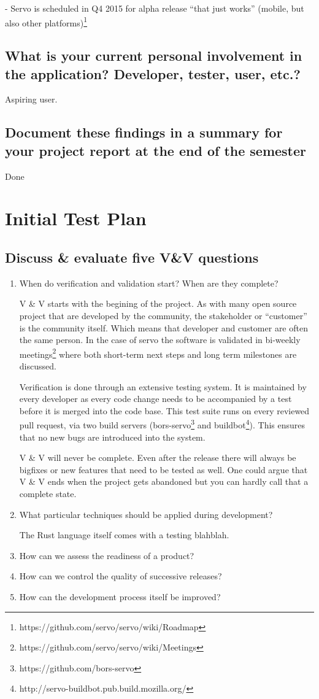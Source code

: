\documentclass{scrartcl}
\begin{document}
- Servo is scheduled in Q4 2015 for alpha release ``that just works'' (mobile, but also other platforms)\footnote{https://github.com/servo/servo/wiki/Roadmap}
\subsection*{What is your current personal involvement in the
application? Developer, tester, user, etc.?}
Aspiring user.
\subsection*{Document these findings in a summary for your project report at the end of the semester}
Done\\

\section{Initial Test Plan}
\subsection{Discuss \& evaluate five V\&V questions}
\begin{enumerate}
  \item When do verification and validation start? When are they complete?
  
  V \& V starts with the begining of the project. As with many open source project that are developed by the community, the stakeholder or ``customer'' is the community itself. Which means that developer and customer are often the same person. In the case of servo the software is validated in bi-weekly meetings\footnote{https://github.com/servo/servo/wiki/Meetings} where both short-term next steps and long term milestones are discussed.
  
  Verification is done through an extensive testing system. It is maintained by every developer as every code change needs to be accompanied by a test before it is merged into the code base. This test suite runs on every reviewed pull request, via two build servers (bors-servo\footnote{https://github.com/bors-servo} and buildbot\footnote{http://servo-buildbot.pub.build.mozilla.org/}). This ensures that no new bugs are introduced into the system.
  
V \& V will never be complete. Even after the release there will always be bigfixes or new features that need to be tested as well. One could argue that V \& V ends when the project gets abandoned but you can hardly call that a complete state.
  \item What particular techniques should be applied during development?
  
  The Rust language itself comes with a testing blahblah.
  \item How can we assess the readiness of a product?
  \item How can we control the quality of successive releases?
  \item How can the development process itself be improved?
\end{enumerate}
\end{document}
